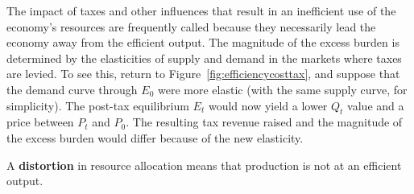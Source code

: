 The impact of taxes and other influences that result in an inefficient use
of the economy's resources are frequently called 
because they necessarily lead the economy away from the efficient output. 
The magnitude of the excess burden is determined by the elasticities of
supply and demand in the markets where taxes are levied. To see this, return
to Figure~\ref{fig:efficiencycosttax}, and suppose that the demand curve
through $E_0$ were more elastic (with the same supply curve, for
simplicity). The post-tax equilibrium $E_t$ would now yield a lower $Q_t$
value and a price between $P_t$ and $P_0$. The resulting tax revenue
raised and the magnitude of the excess burden would differ because of the
new elasticity.

\begin{DefBox}
A \textbf{distortion} in resource allocation means that production is not at an efficient output.
\end{DefBox}
